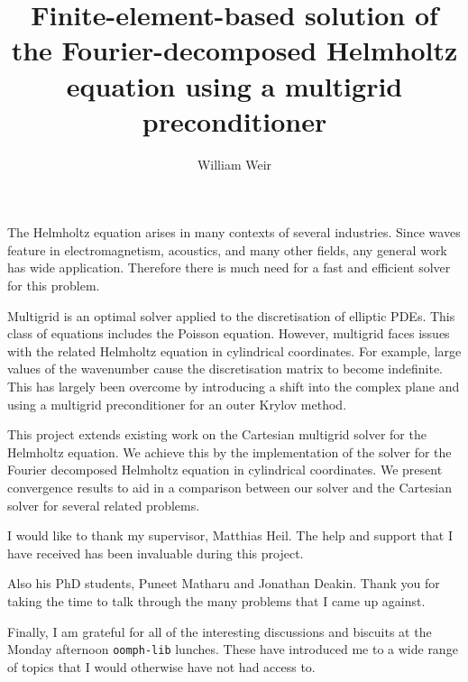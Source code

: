 \title{Finite-element-based solution of the Fourier-decomposed Helmholtz equation using a multigrid preconditioner}
\author{William Weir}
\def\wordcount{xxxxx}




\beforeabstract


The Helmholtz equation arises in many contexts of several industries.
Since waves feature in electromagnetism, acoustics, and many other fields, any general work has wide application.
Therefore there is much need for a fast and efficient solver for this problem.

Multigrid is an optimal solver applied to the discretisation of elliptic PDEs.
This class of equations includes the Poisson equation.
However, multigrid faces issues with the related Helmholtz equation in cylindrical coordinates.
For example, large values of the wavenumber cause the discretisation matrix to become indefinite.
This has largely been overcome by introducing a shift into the complex plane and using a multigrid preconditioner for an outer Krylov method.

This project extends existing work on the Cartesian multigrid solver for the Helmholtz equation.
We achieve this by the implementation of the solver for the Fourier decomposed Helmholtz equation in cylindrical coordinates.
We present convergence results to aid in a comparison between our solver and the Cartesian solver for several related problems.

\afterabstract


I would like to thank my supervisor, Matthias Heil.
The help and support that I have received has been invaluable during this project.

Also his PhD students, Puneet Matharu and Jonathan Deakin.
Thank you for taking the time to talk through the many problems that I came up against.

Finally, I am grateful for all of the interesting discussions and biscuits at the Monday afternoon \texttt{oomph-lib} lunches.
These have introduced me to a wide range of topics that I would otherwise have not had access to.

